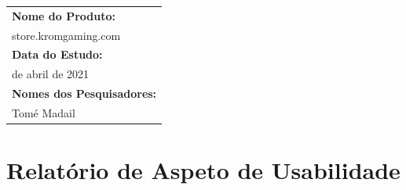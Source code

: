 \documentclass[11pt]{article}
\begin{document}
	
	
	\tableofcontents
	\pagebreak
	
	\normalsize
	\begin{center}
		\begin{tabularx}{\textwidth}{ |>{\raggedright\arraybackslash}X| }
			\hline
			\textbf{Nome do Produto:} \\ 
			store.kromgaming.com \\ \hline
			\textbf{Data do Estudo:} \\ 
			25 de abril de 2021 \\ \hline
			\textbf{Nomes dos Pesquisadores:} \\ 
			Tomé Madail \\ \hline   
		\end{tabularx}
	\end{center}
	
	\large
	\section{Relatório de Aspeto de Usabilidade}
	
\end{document}
